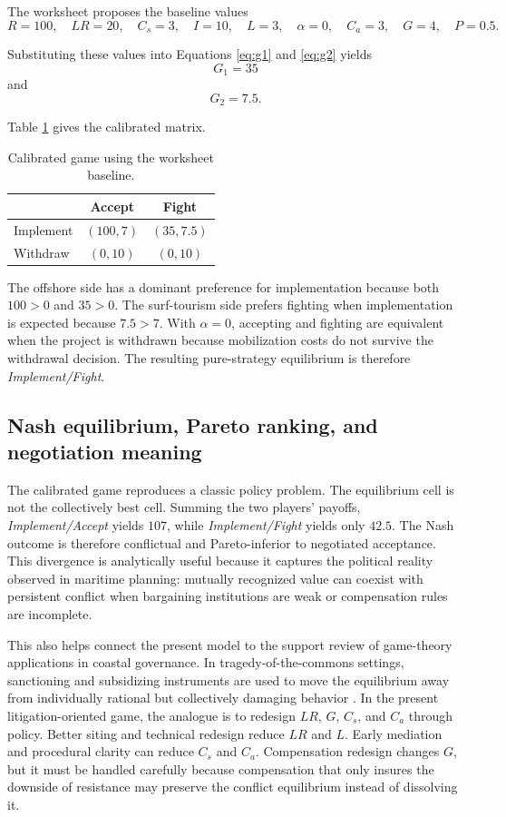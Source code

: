 The worksheet proposes the baseline values
\[
R=100,\quad LR=20,\quad C_s=3,\quad I=10,\quad L=3,\quad \alpha=0,\quad C_a=3,\quad G=4,\quad P=0.5.
\]

Substituting these values into Equations \ref{eq:g1} and \ref{eq:g2} yields
\[
G_1 = 35
\]
and
\[
G_2 = 7.5.
\]

Table \ref{tab:baseline_model} gives the calibrated matrix.

\begin{table}[H]
\centering
\caption{Calibrated game using the worksheet baseline.}
\label{tab:baseline_model}
\begin{tabular}{lcc}
\toprule
 & Accept & Fight \\
\midrule
Implement & $(100, 7)$ & $(35, 7.5)$ \\
Withdraw & $(0, 10)$ & $(0, 10)$ \\
\bottomrule
\end{tabular}
\end{table}

The offshore side has a dominant preference for implementation because both $100>0$ and $35>0$. The surf-tourism side prefers fighting when implementation is expected because $7.5>7$. With $\alpha=0$, accepting and fighting are equivalent when the project is withdrawn because mobilization costs do not survive the withdrawal decision. The resulting pure-strategy equilibrium is therefore \textit{Implement/Fight}.

\subsection{Nash equilibrium, Pareto ranking, and negotiation meaning}

The calibrated game reproduces a classic policy problem. The equilibrium cell is not the collectively best cell. Summing the two players' payoffs, \textit{Implement/Accept} yields $107$, while \textit{Implement/Fight} yields only $42.5$. The Nash outcome is therefore conflictual and Pareto-inferior to negotiated acceptance. This divergence is analytically useful because it captures the political reality observed in maritime planning: mutually recognized value can coexist with persistent conflict when bargaining institutions are weak or compensation rules are incomplete.

This also helps connect the present model to the support review of game-theory applications in coastal governance. In tragedy-of-the-commons settings, sanctioning and subsidizing instruments are used to move the equilibrium away from individually rational but collectively damaging behavior \citep{hardin1968tragedy,ostrom_2015,sobhee_game_2017}. In the present litigation-oriented game, the analogue is to redesign $LR$, $G$, $C_s$, and $C_a$ through policy. Better siting and technical redesign reduce $LR$ and $L$. Early mediation and procedural clarity can reduce $C_s$ and $C_a$. Compensation redesign changes $G$, but it must be handled carefully because compensation that only insures the downside of resistance may preserve the conflict equilibrium instead of dissolving it.

